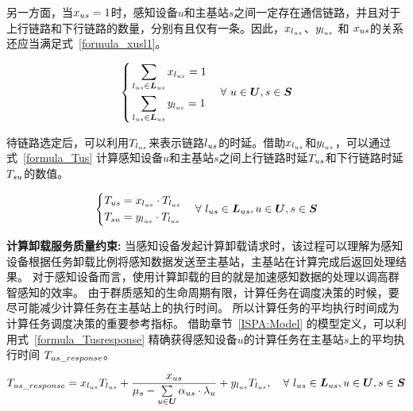 另一方面，当${x}_{us} = 1$时，感知设备$u$和主基站$s$之间一定存在通信链路，并且对于上行链路和下行链路的数量，分别有且仅有一条。因此，$x_{l_{us}}$、$y_{l_{us}}$ 和 ${x}_{us}$的关系还应当满足式~\eqref{formula_xusl1}。

\begin{equation}
  \label{formula_xusl1}
  \left\{
    \begin{aligned}
    &\sum_{l_{us} \in \boldsymbol{L}_{us}}x_{l_{us}} = 1\\
    &\sum_{l_{us} \in \boldsymbol{L}_{us}}y_{l_{us}} = 1
    \end{aligned}
  \right.
  \quad \forall \ u\in \boldsymbol{U}, s\in \boldsymbol{S}
\end{equation}

待链路选定后，可以利用$T_{l_{us}}$来表示链路$l_{us}$的时延。借助$x_{l_{us}}$和$y_{l_{us}}$，可以通过式~\eqref{formula_Tus} 计算感知设备$u$和主基站$s$之间上行链路时延${T}_{us}$和下行链路时延${T}_{su}$的数值。

\begin{equation}
  \label{formula_Tus}
  \left\{
    \begin{aligned}
    &{T}_{us} = x_{l_{us}} \cdot T_{l_{us}}\\
    &{T}_{su} = y_{l_{us}} \cdot T_{l_{us}}
    \end{aligned}
  \right.
  \quad \forall \ l_{us} \in \boldsymbol{L}_{us}, u\in \boldsymbol{U}, s\in \boldsymbol{S}
\end{equation}

\textbf{计算卸载服务质量约束:}
当感知设备发起计算卸载请求时，该过程可以理解为感知设备根据任务卸载比例将感知数据发送至主基站，主基站在计算完成后返回处理结果。
对于感知设备而言，使用计算卸载的目的就是加速感知数据的处理以调高群智感知的效率。
由于群质感知的生命周期有限，计算任务在调度决策的时候，要尽可能减少计算任务在主基站上的执行时间。
所以计算任务的平均执行时间成为计算任务调度决策的重要参考指标。
借助章节~\ref{ISPA:Model} 的模型定义，可以利用式~\eqref{formula_Tusresponse} 精确获得感知设备$u$的计算任务在主基站$s$上的平均执行时间 ${T}_{us\_response}$。


\begin{equation}
\label{formula_Tusresponse}
\begin{gathered}
{T}_{us\_response} = x_{l_{us}} T_{l_{us}} + \frac{{x}_{us}}{{\mu}_{s}-\sum\limits_{u \in \boldsymbol{U}}{\alpha}_{us} \cdot {\lambda}_{u}} + y_{l_{us}} T_{l_{us}},
\quad \forall \ l_{us} \in \boldsymbol{L}_{us}, u\in \boldsymbol{U}, s\in \boldsymbol{S}
\end{gathered}
\end{equation}

